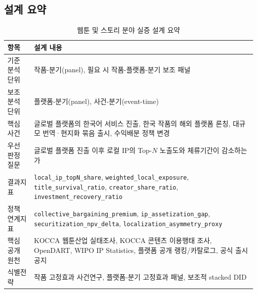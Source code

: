 \documentclass[11pt,a4paper]{report}
\newcommand{\WrapCell}[1]{\parbox[t]{\hsize}{\RaggedRight #1}}
\begin{document}
\subsection{설계 요약}
\begin{table}[H]
  \centering
  \small
  \caption{웹툰 및 스토리 분야 실증 설계 요약}\label{tab:webtoon_design_summary}
  \begin{tabular}{L{2.4cm}L{10.0cm}}
    \toprule
    항목 & 설계 내용 \\
    \midrule
    기준 분석 단위 & 작품-분기(panel), 필요 시 작품-플랫폼-분기 보조 패널 \\
    보조 분석 단위 & 플랫폼-분기(panel), 사건-분기(event-time) \\
    핵심 사건 & 글로벌 플랫폼의 한국어 서비스 진출, 한국 작품의 해외 플랫폼 론칭, 대규모 번역·현지화 묶음 출시, 수익배분 정책 변경 \\
    우선 판정 질문 & 글로벌 플랫폼 진출 이후 로컬 IP의 Top-$N$ 노출도와 체류기간이 감소하는가 \\
    결과지표 & \WrapCell{\texttt{local\_ip\_topN\_share}, \texttt{weighted\_local\_exposure},\\\texttt{title\_survival\_ratio}, \texttt{creator\_share\_ratio},\\\texttt{investment\_recovery\_ratio}} \\
    정책 연계지표 & \WrapCell{\nolinkurl{collective_bargaining_premium}, \texttt{ip\_assetization\_gap},\\\texttt{securitization\_npv\_delta}, \nolinkurl{localization_asymmetry_proxy}} \\
    핵심 공개 원천 & KOCCA 웹툰산업 실태조사, KOCCA 콘텐츠 이용행태 조사, OpenDART, WIPO IP Statistics, 플랫폼 공개 랭킹/카탈로그, 공식 출시 공지 \\
    식별전략 & 작품 고정효과 사건연구, 플랫폼-분기 고정효과 패널, 보조적 stacked DID \\
    \bottomrule
  \end{tabular}
\end{table}
\end{document}
